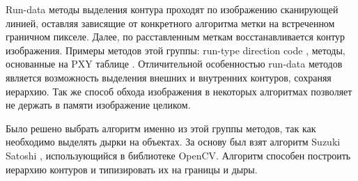 \documentclass{fefu_thesis/cls/fefu}
\begin{document}
    Run-data методы выделения контура проходят по изображению сканирующей линией, оставляя зависящие от конкретного алгоритма метки на встреченном граничном пикселе. Далее, по расставленным меткам восстанавливается контур изображения. Примеры методов этой группы: run-type direction code \cite{Miyatake1997}, методы, основанные на PXY таблице \cite{Shoji}. Отличительной особенностью run-data методов является возможность выделения внешних и внутренних контуров, сохраняя иерархию. Так же способ обхода изображения в некоторых алгоритмах позволяет не держать в памяти изображение целиком.

    Было решено выбрать алгоритм именно из этой группы методов, так как необходимо выделять дырки на объектах. За основу был взят алгоритм Suzuki Satoshi \cite{SuzukiAlgorithm}, использующийся в библиотеке OpenCV. Алгоритм способен построить иерархию контуров и типизировать их на границы и дыры.
\end{document}
